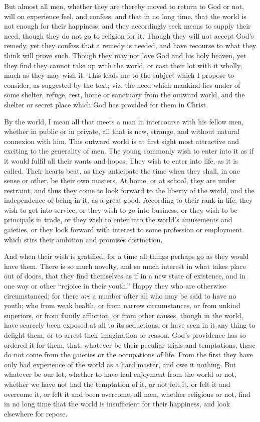 But almost all men, whether they are thereby moved to return to God
or not, will on experience feel, and confess, and that in no long
time, that the world is not enough for their happiness; and they
accordingly seek means to supply their need, though they do not go to
religion for it. Though they will not accept God's remedy, yet they
confess that a remedy is needed, and have recourse to what they think
will prove such. Though they may not love God and his holy heaven, yet
they find they cannot take up with the world, or cast their lot with
it wholly, much as they may wish it. This leads me to the subject
which I propose to consider, as suggested by the text; viz. the need
which mankind lies under of some shelter, refuge, rest, home or
sanctuary from the outward world, and the shelter or secret place
which God has provided for them in Christ.

By the world, I mean all that meets a man in intercourse with his
fellow men, whether in public or in private, all that is new, strange,
and without natural connexion with him. This outward world is at first
sight most attractive and exciting to the generality of men. The young
commonly wish to enter into it as if it would fulfil all their wants
and hopes. They wish to enter into life, as it is called. Their hearts
beat, as they anticipate the time when they shall, in one sense or
other, be their own masters. At home, or at school, they are under
restraint, and thus they come to look forward to the liberty of the
world, and the independence of being in it, as a great good. According
to their rank in life, they wish to get into service, or they wish to
go into business, or they wish to be principals in trade, or they wish
to enter into the world's amusements and gaieties, or they look
forward with interest to some profession or employment which stirs
their ambition and promises distinction.

And when their wish is gratified, for a time all things perhaps go
as they would have them. There is so much novelty, and so much
interest in what takes place out of doors, that they find themselves
as if in a new state of existence, and in one way or other
``rejoice in their youth.'' Happy they who are otherwise
circumstanced; for there \emph{are} a number after all who may be said
to have no youth; who from weak health, or from narrow circumstances,
or from unkind superiors, or from family affliction, or from other
causes, though in the world, have scarcely been exposed at all to its
seductions, or have seen in it any thing to delight them, or to arrest
their imagination or reason. God's providence has so ordered it for
them, that, whatever be their peculiar trials and temptations, these
do not come from the gaieties or the occupations of life. From the
first they have only had experience of the world as a hard master, and
owe it nothing. But whatever be our lot, whether to have had enjoyment
from the world or not, whether we have not had the temptation of it,
or not felt it, or felt it and overcome it, or felt it and been
overcome, all men, whether religious or not, find in no long time that
the world is insufficient for their happiness, and look elsewhere for
repose.

